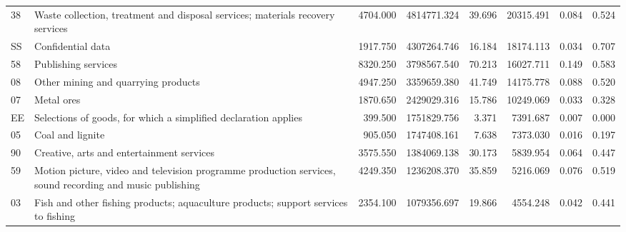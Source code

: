 \begin{tabular}{llrrrrrr}
          38 &                               Waste collection, treatment and disposal services; materials recovery services &        4704.000 &      4814771.324 &      39.696 &            20315.491 &        0.084 &                 0.524 \\
          SS &                                                                                            Confidential data &        1917.750 &      4307264.746 &      16.184 &            18174.113 &        0.034 &                 0.707 \\
          58 &                                                                                          Publishing services &        8320.250 &      3798567.540 &      70.213 &            16027.711 &        0.149 &                 0.583 \\
          08 &                                                                          Other mining and quarrying products &        4947.250 &      3359659.380 &      41.749 &            14175.778 &        0.088 &                 0.520 \\
          07 &                                                                                                   Metal ores &        1870.650 &      2429029.316 &      15.786 &            10249.069 &        0.033 &                 0.328 \\
          EE &                                              Selections of goods, for which a simplified declaration applies &         399.500 &      1751829.756 &       3.371 &             7391.687 &        0.007 &                 0.000 \\
          05 &                                                                                             Coal and lignite &         905.050 &      1747408.161 &       7.638 &             7373.030 &        0.016 &                 0.197 \\
          90 &                                                                    Creative, arts and entertainment services &        3575.550 &      1384069.138 &      30.173 &             5839.954 &        0.064 &                 0.447 \\
          59 &     Motion picture, video and television programme production services, sound recording and music publishing &        4249.350 &      1236208.370 &      35.859 &             5216.069 &        0.076 &                 0.519 \\
          03 &                           Fish and other fishing products; aquaculture products; support services to fishing &        2354.100 &      1079356.697 &      19.866 &             4554.248 &        0.042 &                 0.441 \\

\end{tabular}
